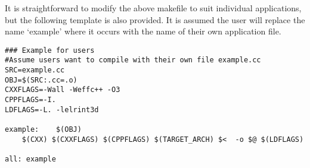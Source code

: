 \documentclass[10pt]{article}
\begin{document}
It is straightforward to modify the above makefile to suit individual applications, but the following template is also provided.  It is assumed the user will replace the name `example' where it occurs with the name of their own application file.


\begin{verbatim}
### Example for users
#Assume users want to compile with their own file example.cc
SRC=example.cc
OBJ=$(SRC:.cc=.o)
CXXFLAGS=-Wall -Weffc++ -O3
CPPFLAGS=-I.
LDFLAGS=-L. -lelrint3d

example:    $(OBJ)
    $(CXX) $(CXXFLAGS) $(CPPFLAGS) $(TARGET_ARCH) $<  -o $@ $(LDFLAGS)

all: example
\end{verbatim}
\end{document}
